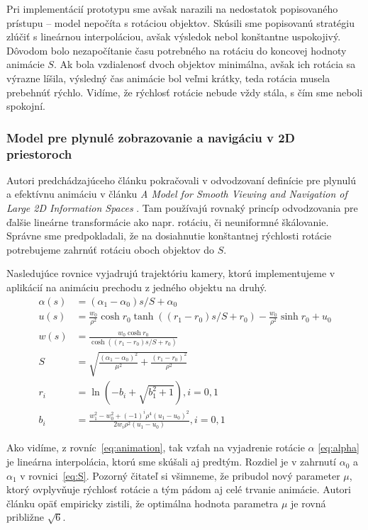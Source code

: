 Pri implementácií prototypu sme avšak narazili na nedostatok popisovaného prístupu -- model nepočíta s rotáciou objektov. Skúsili sme popisovanú stratégiu zlúčiť s lineárnou interpoláciou, avšak výsledok nebol konštantne uspokojivý. Dôvodom bolo nezapočítanie času potrebného na rotáciu do koncovej hodnoty animácie $S$. Ak bola vzdialenosť dvoch objektov minimálna, avšak ich rotácia sa výrazne líšila, výsledný čas animácie bol veľmi krátky, teda rotácia musela prebehnúť rýchlo. Vidíme, že rýchlosť rotácie nebude vždy stála, s čím sme neboli spokojní.

\subsubsection{Model pre plynulé zobrazovanie a navigáciu v 2D priestoroch} \label{sec:animation}

Autori predchádzajúceho článku pokračovali v odvodzovaní definície pre plynulú a efektívnu animáciu v článku \textit{A Model for Smooth Viewing and Navigation of Large 2D Information Spaces} \cite{wijk2}. Tam používajú rovnaký princíp odvodzovania pre ďalšie lineárne transformácie ako napr. rotáciu, či neuniformné škálovanie. Správne sme predpokladali, že na dosiahnutie konštantnej rýchlosti rotácie potrebujeme zahrnúť rotáciu oboch objektov do $S$.

Nasledujúce rovnice vyjadrujú trajektóriu kamery, ktorú implementujeme v aplikácií na animáciu prechodu z jedného objektu na druhý.
\begin{subequations}
\label{eq:animation}
\begin{align}
\alpha(s) &= (\alpha_1 - \alpha_0) s / S + \alpha_0 \label{eq:alpha}\\
u(s) &= \frac{w_0}{\rho^2} \cosh r_0 \tanh ((r_1 - r_0) s/S + r_0) - \frac{w_0}{\rho^2} \sinh r_0 + u_0\\
w(s) &= \frac{w_0 \cosh r_0}{\cosh \left(\left(r_1 - r_0\right) s/S + r_0\right)}\\
S &= \sqrt{\frac{(\alpha_1 - \alpha_0)^2}{\mu^2} + \frac{(r_1 - r_0)^2}{\rho^2}} \label{eq:S}\\
r_i &= \ln \left(-b_i + \sqrt{b_1^2 + 1}\right), i = 0, 1 \\
b_i &= \frac{w_1^2 - w_0^2 + (-1)^i \rho^4 (u_1 - u_0)^2}{2 w_i \rho^2 (u_1 - u_0)}, i = 0, 1
\end{align}
\end{subequations}

Ako vidíme, z rovníc~\eqref{eq:animation}, tak vzťah na vyjadrenie rotácie $\alpha$ \eqref{eq:alpha} je lineárna interpolácia, ktorú sme skúšali aj predtým. Rozdiel je v zahrnutí $\alpha_0$ a $\alpha_1$ v rovnici~\eqref{eq:S}. Pozorný čitateľ si všimneme, že pribudol nový parameter $\mu$, ktorý ovplyvňuje rýchlosť rotácie a tým pádom aj celé trvanie animácie. Autori článku opäť empiricky zistili, že optimálna hodnota parametra $\mu$ je rovná približne $\sqrt{6}$.

